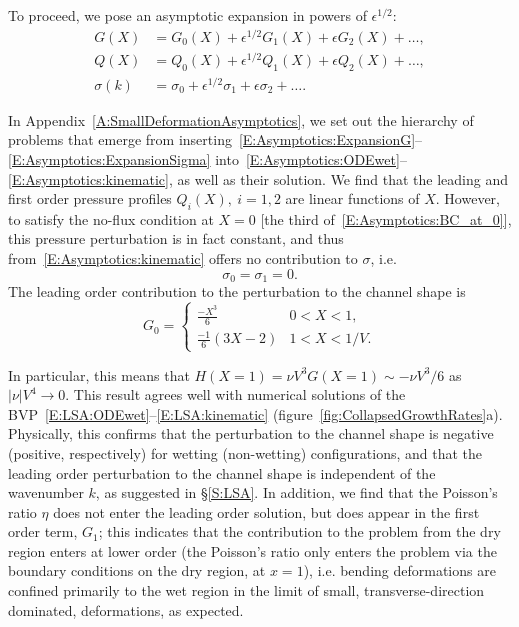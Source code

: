 \documentclass{jfm}
\newcommand{\poisson}{\eta} %
\begin{document}
To proceed, we pose an asymptotic expansion in powers of $\epsilon^{1/2}$:
\begin{align}
G(X) &=    G_0(X) + \epsilon^{1/2} G_1(X) + \epsilon G_2(X)+ \dots,\label{E:Asymptotics:ExpansionG} \\
Q(X) &=  Q_0(X) + \epsilon^{1/2} Q_1(X) + \epsilon Q_2(X)+\dots,\label{E:Asymptotics:ExpansionQ} \\
\sigma(k) &= \sigma_0 + \epsilon^{1/2} \sigma_1 + \epsilon \sigma_2+ \dots. \label{E:Asymptotics:ExpansionSigma}
\end{align}

In Appendix~\ref{A:SmallDeformationAsymptotics}, we set out the hierarchy of problems that emerge from inserting~\eqref{E:Asymptotics:ExpansionG}--\eqref{E:Asymptotics:ExpansionSigma} into~\eqref{E:Asymptotics:ODEwet}--\eqref{E:Asymptotics:kinematic}, as well as their solution.  We find that the leading and first order pressure profiles $Q_i(X),~i = 1,2$ are linear functions of $X$. However, to satisfy the no-flux condition at $X =0$ [the third of~\eqref{E:Asymptotics:BC_at_0}], this pressure perturbation is in fact constant, and thus from~\eqref{E:Asymptotics:kinematic} offers no contribution to $\sigma$, i.e.
\begin{equation}
\sigma_{0} = \sigma_{1} = 0.
\end{equation}
The leading order contribution to the perturbation to the channel shape is
\begin{equation}\label{E:Asymptotics:ChannelShapeSolution}
G_{0} =\begin{cases}
\frac{-X^3}{6} & 0 < X < 1,\\
\frac{-1}{6}(3X-2) & 1 < X < 1/V.
\end{cases}
\end{equation}

In particular, this means that $H(X=1) = \nu V^3 G(X=1)\sim -\nu V^3/6$ as $|\nu| V^4 \to 0$. This result agrees well with numerical solutions of the BVP~\eqref{E:LSA:ODEwet}--\eqref{E:LSA:kinematic} (figure~\ref{fig:CollapsedGrowthRates}a). Physically, this confirms that the perturbation to the channel shape is negative (positive, respectively) for wetting (non-wetting) configurations, and that the leading order perturbation to the channel shape is independent of the wavenumber $k$, as suggested in \S\ref{S:LSA}. In addition, we find that the Poisson's ratio $\poisson$ does not enter the leading order solution, but does appear in the first order term, $G_{1}$; this indicates that the contribution to the problem from the dry region enters at lower order (the Poisson's ratio only enters the problem via the boundary conditions on the dry region, at $x = 1$), i.e. bending deformations are confined primarily to the wet region in the limit of small, transverse-direction dominated, deformations, as expected.
\end{document}
